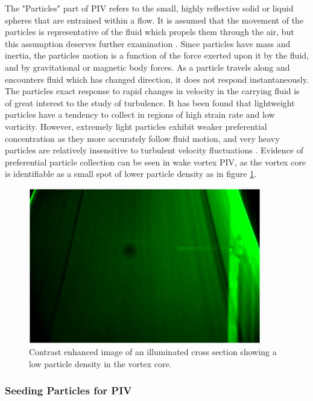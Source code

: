 The "Particles" part of PIV refers to the small, highly reflective solid or 
liquid spheres that are entrained within a flow. It is assumed that the 
movement of the particles is representative of the fluid which propels them 
through the air, but this assumption deserves further examination 
\cite{roscoe1952}. Since particles have mass and inertia, the particles motion 
is a function of the force exerted upon it by the fluid, and by gravitational 
or magnetic body forces. As a particle travels along and encounters fluid which 
has changed direction, it does not respond instantaneously. The particles exact 
response to rapid changes in velocity in the carrying fluid is of great 
interest to the study of turbulence. It has been found that lightweight 
particles have a tendency to collect in regions of high strain rate and low 
vorticity. However, extremely light particles exhibit weaker preferential 
concentration as they more accurately follow fluid motion, and very heavy 
particles are relatively insensitive to turbulent velocity fluctuations 
\cite{squires1990}. Evidence of preferential particle collection can be seen in 
wake vortex PIV, as the vortex core is identifiable as a small spot of lower 
particle density as in figure \ref{fig:vortex_core_particles}.
	
\begin{figure}
	\centering
	\includegraphics[width=4in]{figs/piv_method/vortex_core}
	\caption{Contrast enhanced image of an illuminated cross section showing a 
	low particle density in the vortex core.}
	\label{fig:vortex_core_particles}
\end{figure}


\subsubsection{Seeding Particles for PIV}

